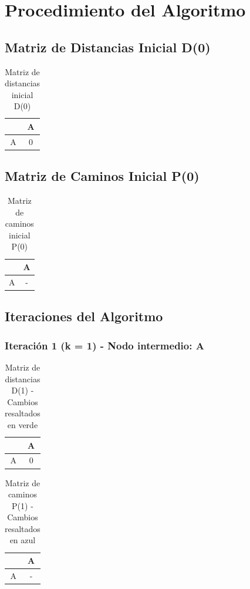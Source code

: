 \documentclass[12pt]{article}
\begin{document}
\clearpage
\section{Procedimiento del Algoritmo}
\subsection{Matriz de Distancias Inicial D(0)}
\begin{table}[h!]
\centering
\begin{tabular}{|c|c|}
\hline
 & A \\\hline
A & 0 \\\hline
\end{tabular}
\caption{Matriz de distancias inicial D(0)}
\end{table}

\clearpage
\subsection{Matriz de Caminos Inicial P(0)}
\begin{table}[h!]
\centering
\begin{tabular}{|c|c|}
\hline
 & A \\\hline
A & - \\\hline
\end{tabular}
\caption{Matriz de caminos inicial P(0)}
\end{table}

\clearpage
\subsection{Iteraciones del Algoritmo}
\subsubsection{Iteración 1 (k = 1) - Nodo intermedio: A}
\begin{table}[h!]
\centering
\begin{tabular}{|c|c|}
\hline
 & A \\\hline
A & 0 \\\hline
\end{tabular}
\caption{Matriz de distancias D(1) - Cambios resaltados en verde}
\end{table}

\begin{table}[h!]
\centering
\begin{tabular}{|c|c|}
\hline
 & A \\\hline
A & - \\\hline
\end{tabular}
\caption{Matriz de caminos P(1) - Cambios resaltados en azul}
\end{table}
\end{document}
